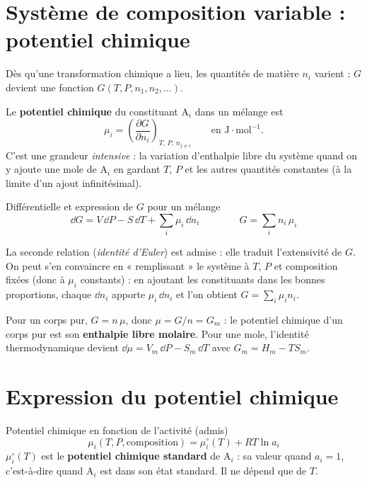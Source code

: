 \section{Système de composition variable : potentiel chimique}

Dès qu'une transformation chimique a lieu, les quantités de matière $n_i$ varient : $G$ devient une fonction $G(T, P, n_1, n_2, \dots)$.

\begin{definition}
Le \textbf{potentiel chimique} du constituant $\mathrm{A}_i$ dans un mélange est
\[ \mu_i = \left(\frac{\partial G}{\partial n_i}\right)_{T,\,P,\,n_{j\neq i}} \qquad\text{en }\mathrm{J\cdot mol^{-1}}. \]
C'est une grandeur \emph{intensive} : la variation d'enthalpie libre du système quand on y ajoute une mole de $\mathrm{A}_i$ en gardant $T$, $P$ et les autres quantités constantes (à la limite d'un ajout infinitésimal).
\end{definition}

\begin{resultat}{Différentielle et expression de $G$ pour un mélange}
\[ \dd G = V\,\dd P - S\,\dd T + \sum_i \mu_i\,\dd n_i \qquad\qquad G = \sum_i n_i\,\mu_i \]
\end{resultat}

La seconde relation (\emph{identité d'Euler}) est admise : elle traduit l'extensivité de $G$. On peut s'en convaincre en « remplissant » le système à $T$, $P$ et composition fixées (donc à $\mu_i$ constants) : en ajoutant les constituants dans les bonnes proportions, chaque $\dd n_i$ apporte $\mu_i\,\dd n_i$ et l'on obtient $G = \sum_i \mu_i n_i$.

\begin{exemple}
Pour un corps pur, $G = n\,\mu$, donc $\mu = G/n = G_m$ : le potentiel chimique d'un corps pur est son \textbf{enthalpie libre molaire}. Pour une mole, l'identité thermodynamique devient $\dd\mu = V_m\,\dd P - S_m\,\dd T$ avec $G_m = H_m - TS_m$.
\end{exemple}

\section{Expression du potentiel chimique}

\begin{resultat}{Potentiel chimique en fonction de l'activité (admis)}
\[ \boxed{\mu_i(T, P, \text{composition}) = \mu_i^\circ(T) + RT\ln a_i} \]
$\mu_i^\circ(T)$ est le \textbf{potentiel chimique standard} de $\mathrm{A}_i$ : sa valeur quand $a_i = 1$, c'est-à-dire quand $\mathrm{A}_i$ est dans son état standard. Il ne dépend que de $T$.
\end{resultat}

